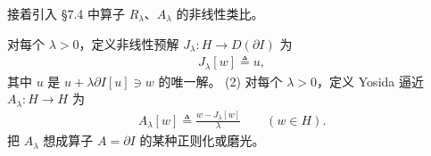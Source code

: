 \documentclass[../../main.tex]{subfiles}
\begin{document}
接着引入 \S7.4 中算子 $R_\lambda$、$A_\lambda$ 的非线性类比。

\begin{definition}[1]\label{definition:ch09-6-预解Yosida} 对每个 $\lambda>0$，定义非线性预解 $J_\lambda:H\to D(\partial I)$ 为
\begin{align*}
J_\lambda[w]\triangleq u,
\end{align*}
其中 $u$ 是 $u+\lambda\partial I[u]\ni w$ 的唯一解。
(2) 对每个 $\lambda>0$，定义 Yosida 逼近 $A_\lambda:H\to H$ 为
\begin{align}
A_\lambda[w]\triangleq\frac{w-J_\lambda[w]}{\lambda}\qquad (w\in H).\label{align:ch09-6-eq07}
\end{align}
把 $A_\lambda$ 想成算子 $A=\partial I$ 的某种正则化或磨光。
\end{definition}
\end{document}
